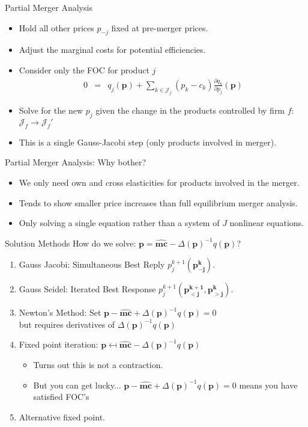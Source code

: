 \begin{frame}{Partial Merger Analysis}
\begin{itemize}
\item Hold all other prices $p_{-j}$ fixed at \alert{pre-merger} prices.
\item Adjust the marginal costs for potential efficiencies.
\item Consider only the FOC for product $j$
\begin{eqnarray*}
0&=& q_j(\mathbf{p}) + \sum_{k \in \mathcal{J}_f} (p_k - c_k) \frac{\partial q_{k}}{\partial p_j}(\mathbf{p})
\end{eqnarray*}
\item Solve for the new $p_j$ given the change in the products controlled by firm $f$: $\mathcal{J}_f \rightarrow \mathcal{J}_f'$
\item This is a single Gauss-Jacobi step (only products involved in merger).
\end{itemize}
\end{frame} 

\begin{frame}{Partial Merger Analysis: Why bother?}
\begin{itemize}
\item We only need own and cross elasticities for products involved in the merger.
\item Tends to show smaller price increases than full equilibrium merger analysis.
\item Only solving a single equation rather than a system of $J$ nonlinear equations.
\end{itemize}
\end{frame} 



\begin{frame}{Solution Methods}
How do we solve: $\mathbf{p} = \widehat{\mathbf{mc}} - \Delta(\mathbf{p})^{-1}q(\mathbf{p})$?
\begin{enumerate}
\item Gauss Jacobi: Simultaneous Best Reply  $p_j^{k+1}(\mathbf{p_{-j}^k})$.
\item Gauss Seidel: Iterated Best Response  $p_j^{k+1}(\mathbf{p_{<j}^{k+1}},\mathbf{p_{>j}^{k}})$.
\item Newton's Method: Set $\mathbf{p} - \widehat{\mathbf{mc}} + \Delta(\mathbf{p})^{-1}q(\mathbf{p})=0$\\ but requires derivatives of $\Delta(\mathbf{p})^{-1}q(\mathbf{p})$
\item Fixed point iteration: $\mathbf{p} \mapsfrom \widehat{\mathbf{mc}} - \Delta(\mathbf{p})^{-1}q(\mathbf{p})$
\begin{itemize}
\item Turns out this is \alert{not a contraction}.
\item But you can get lucky... $\mathbf{p} - \widehat{\mathbf{mc}} + \Delta(\mathbf{p})^{-1}q(\mathbf{p})=0$ means you have satisfied FOC's
\end{itemize}
\item Alternative fixed point.
\end{enumerate}
\end{frame} 

